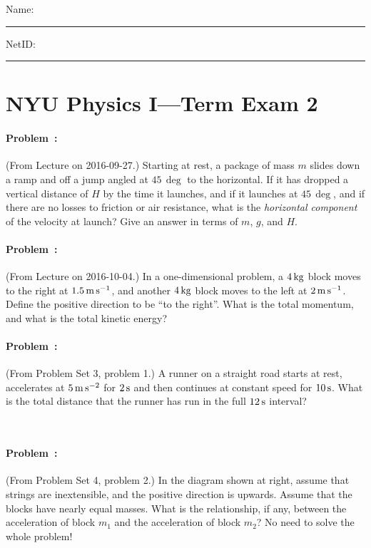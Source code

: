 \documentclass[12pt]{article}
\begin{document}
\noindent
Name: \rule[-1ex]{0.55\textwidth}{0.1pt}
NetID: \rule[-1ex]{0.2\textwidth}{0.1pt}

\section*{NYU Physics I---Term Exam 2}

\paragraph{Problem~\theproblem:}%
(From Lecture on 2016-09-27.) Starting at rest, a package of mass $m$
slides down a ramp and off a jump angled at $45\,\deg$ to the
horizontal. If it has dropped a vertical distance of $H$ by the time
it launches, and if it launches at $45\,\deg$, and if there are no
losses to friction or air resistance, what is the \emph{horizontal
  component} of the velocity at launch? Give an answer in terms of
$m$, $g$, and $H$.

\vfill

\paragraph{Problem~\theproblem:}%
(From Lecture on 2016-10-04.) In a one-dimensional problem, a $4\,\mathrm{kg}$
block moves to the right at $1.5\,\mathrm{m}\,\mathrm{s}^{-1}$, and another $4\,\mathrm{kg}$ block
moves to the left at $2\,\mathrm{m}\,\mathrm{s}^{-1}$. Define the positive direction to be
``to the right''. What is the total momentum, and what is the total
kinetic energy?

\vfill

\paragraph{Problem~\theproblem:}%
(From Problem Set 3, problem 1.) A runner on a straight road starts
at rest, accelerates at $5\,\mathrm{m}\,\mathrm{s}^{-2}$ for $2\,\mathrm{s}$ and then continues at
constant speed for $10\,\mathrm{s}$. What is the total distance that the
runner has run in the full $12\,\mathrm{s}$ interval?

\vfill
~

\clearpage
\paragraph{Problem~\theproblem:}%
(From Problem Set 4, problem 2.) In the diagram shown at right, assume
that strings are inextensible, and the positive direction is
upwards. Assume that the blocks have nearly equal masses. What is the
relationship, if any, between the acceleration of block $m_1$ and the
acceleration of block $m_2$? No need to solve the whole problem!
\end{document}
